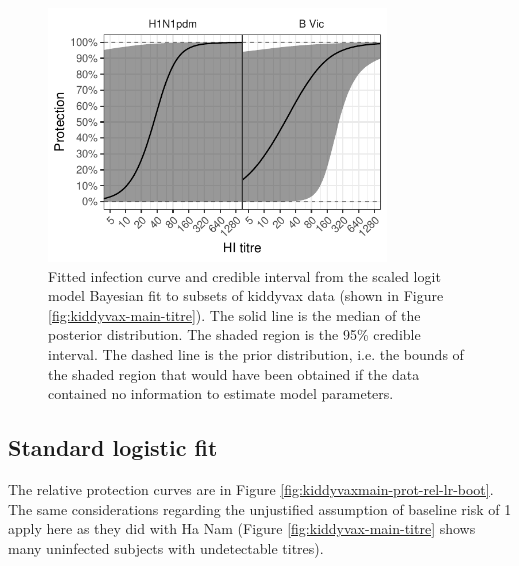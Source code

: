 \documentclass[12pt]{article}
\begin{document}
\begin{figure}[htp]
	\centering
	\includegraphics[width=0.8\textwidth]{../fit-sclr-bayesian-plot/kiddyvaxmain-prot.pdf}
	\caption{
Fitted infection curve and credible interval from the scaled logit model Bayesian fit to subsets of kiddyvax data (shown in Figure \ref{fig:kiddyvax-main-titre}). The solid line is the median of the posterior distribution. The shaded region is the 95\% credible interval. The dashed line is the prior distribution, i.e. the bounds of the shaded region that would have been obtained if the data contained no information to estimate model parameters.
	}
	\label{fig:kiddyvaxmain-prot-bayes-sclr}
\end{figure}



%
\subsection{Standard logistic fit}

The relative protection curves are in Figure \ref{fig:kiddyvaxmain-prot-rel-lr-boot}. The same considerations regarding the unjustified assumption of baseline risk of 1 apply here as they did with Ha Nam (Figure \ref{fig:kiddyvax-main-titre} shows many uninfected subjects with undetectable titres).
\end{document}
